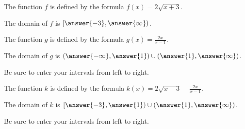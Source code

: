 \documentclass{ximera}
\author{Bobby Ramsey}
\begin{document}
\begin{exercise} 
	The function $f$ is defined by the formula $f(x)=2\sqrt{x+3}$.
	\begin{center}
		The domain of $f$ is $[\answer{-3},\answer{\infty})$.
	\end{center}
\end{exercise}

\begin{exercise} 
	The function $g$ is defined by the formula $g(x)=\frac{2x}{x-1}$.
	\begin{center}
		The domain of $g$ is $(\answer{-\infty},\answer{1}) \cup (\answer{1}, \answer{\infty})$.
	\end{center}
	\begin{feedback}
		Be sure to enter your intervals from left to right.
	\end{feedback}
\end{exercise}

\begin{exercise} 
	The function $k$ is defined by the formula $k(x)=2\sqrt{x+3} - \frac{2x}{x-1}$.
	\begin{center}
		The domain of $k$ is $[\answer{-3},\answer{1}) \cup (\answer{1}, \answer{\infty})$.
	\end{center}
	\begin{feedback}
		Be sure to enter your intervals from left to right.
	\end{feedback}
\end{exercise}
\end{document}
